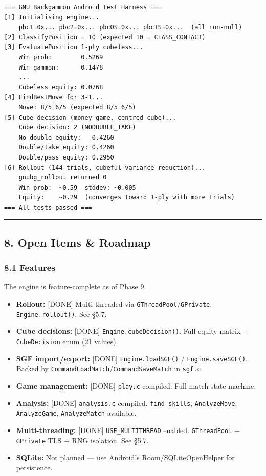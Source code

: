 \documentclass[11pt,a4paper]{article}
\providecommand{\tightlist}{\setlength{\itemsep}{2pt}\setlength{\parskip}{0pt}}
\begin{document}
\begin{verbatim}
=== GNU Backgammon Android Test Harness ===
[1] Initialising engine...
    pbc1=0x... pbc2=0x... pbcOS=0x... pbcTS=0x...  (all non-null)
[2] ClassifyPosition = 10 (expected 10 = CLASS_CONTACT)
[3] EvaluatePosition 1-ply cubeless...
    Win prob:        0.5269
    Win gammon:      0.1478
    ...
    Cubeless equity: 0.0768
[4] FindBestMove for 3-1...
    Move: 8/5 6/5 (expected 8/5 6/5)
[5] Cube decision (money game, centred cube)...
    Cube decision: 2 (NODOUBLE_TAKE)
    No double equity:   0.4260
    Double/take equity: 0.4260
    Double/pass equity: 0.2950
[6] Rollout (144 trials, cubeful variance reduction)...
    gnubg_rollout returned 0
    Win prob:  ~0.59  stddev: ~0.005
    Equity:    ~0.29  (converges toward 1-ply with more trials)
=== All tests passed ===
\end{verbatim}

\begin{center}\rule{0.5\linewidth}{0.5pt}\end{center}

\subsection{8. Open Items \& Roadmap}\label{open-items-roadmap}

\subsubsection{8.1 Features}\label{features}

The engine is feature-complete as of Phase 9.

\begin{itemize}
\tightlist
\item
  \textbf{Rollout:} {[}DONE{]} Multi-threaded via
  \texttt{GThreadPool}/\texttt{GPrivate}. \texttt{Engine.rollout()}. See
  §5.7.
\item
  \textbf{Cube decisions:} {[}DONE{]} \texttt{Engine.cubeDecision()}.
  Full equity matrix + \texttt{CubeDecision} enum (21 values).
\item
  \textbf{SGF import/export:} {[}DONE{]} \texttt{Engine.loadSGF()} /
  \texttt{Engine.saveSGF()}. Backed by
  \texttt{CommandLoadMatch}/\texttt{CommandSaveMatch} in \texttt{sgf.c}.
\item
  \textbf{Game management:} {[}DONE{]} \texttt{play.c} compiled. Full
  match state machine.
\item
  \textbf{Analysis:} {[}DONE{]} \texttt{analysis.c} compiled.
  \texttt{find\_skills}, \texttt{AnalyzeMove}, \texttt{AnalyzeGame},
  \texttt{AnalyzeMatch} available.
\item
  \textbf{Multi-threading:} {[}DONE{]} \texttt{USE\_MULTITHREAD}
  enabled. \texttt{GThreadPool} + \texttt{GPrivate} TLS + RNG isolation.
  See §5.7.
\item
  \textbf{SQLite:} Not planned --- use Android's Room/SQLiteOpenHelper
  for persistence.
\end{itemize}
\end{document}

